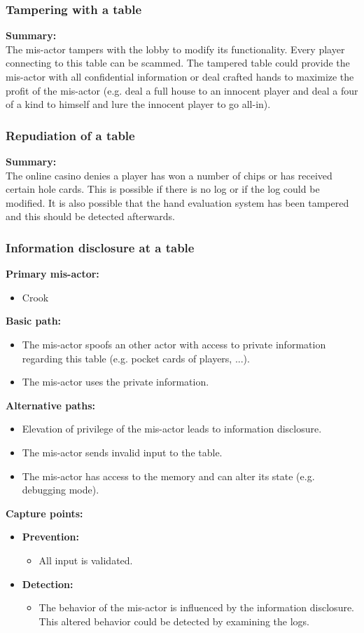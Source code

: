 \documentclass[a4paper,11pt]{report}
\begin{document}
\subsubsection{Tampering with a table}
\textbf{Summary:} \\
The mis-actor tampers with the lobby to modify its functionality. Every player connecting to this table can be scammed. The tampered table could provide the mis-actor with all confidential information or deal crafted hands to maximize the profit of the mis-actor (e.g. deal a full house to an innocent player and deal a four of a kind to himself and lure the innocent player to go all-in).
\subsubsection{Repudiation of a table}
\textbf{Summary:} \\
The online casino denies a player has won a number of chips or has received certain hole cards. This is possible if there is no log or if the log could be modified. It is also possible that the hand evaluation system has been tampered and this should be detected afterwards. 
\subsubsection{Information disclosure at a table}
\textbf{Primary mis-actor:}
\begin{itemize}
\item Crook
\end{itemize}
\textbf{Basic path:}
\begin{itemize}
\item The mis-actor spoofs an other actor with access to private information regarding this table
(e.g. pocket cards of players, ...).
\item The mis-actor uses the private information.
\end{itemize}
\textbf{Alternative paths:}
\begin{itemize}
\item Elevation of privilege of the mis-actor leads to information disclosure.
\item The mis-actor sends invalid input to the table.
\item The mis-actor has access to the memory and can alter its state (e.g. debugging mode).
\end{itemize}
\textbf{Capture points:}
\begin{itemize}
\item \textbf{Prevention:}
\begin{itemize}
\item All input is validated.
\end{itemize}
\item \textbf{Detection:}
\begin{itemize}
\item The behavior of the mis-actor is influenced by the information disclosure. This altered behavior could be detected by examining the logs.
\end{itemize}
\end{itemize}
\end{document}
